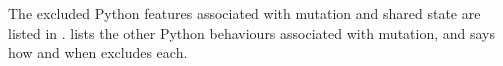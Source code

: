 The excluded Python features associated with mutation and shared state are listed in
.  lists the other Python behaviours associated with mutation, and
says how and when \PurePy excludes each.


